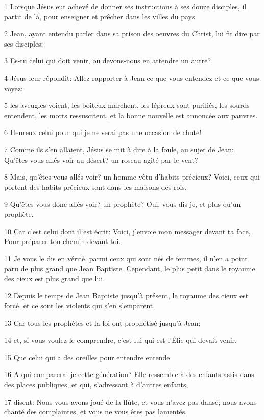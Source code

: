 \par 1 Lorsque Jésus eut achevé de donner ses instructions à ses douze disciples, il partit de là, pour enseigner et prêcher dans les villes du pays.
\par 2 Jean, ayant entendu parler dans sa prison des oeuvres du Christ, lui fit dire par ses disciples:
\par 3 Es-tu celui qui doit venir, ou devons-nous en attendre un autre?
\par 4 Jésus leur répondit: Allez rapporter à Jean ce que vous entendez et ce que vous voyez:
\par 5 les aveugles voient, les boiteux marchent, les lépreux sont purifiés, les sourds entendent, les morts ressuscitent, et la bonne nouvelle est annoncée aux pauvres.
\par 6 Heureux celui pour qui je ne serai pas une occasion de chute!
\par 7 Comme ils s'en allaient, Jésus se mit à dire à la foule, au sujet de Jean: Qu'êtes-vous allés voir au désert? un roseau agité par le vent?
\par 8 Mais, qu'êtes-vous allés voir? un homme vêtu d'habits précieux? Voici, ceux qui portent des habits précieux sont dans les maisons des rois.
\par 9 Qu'êtes-vous donc allés voir? un prophète? Oui, vous dis-je, et plus qu'un prophète.
\par 10 Car c'est celui dont il est écrit: Voici, j'envoie mon messager devant ta face, Pour préparer ton chemin devant toi.
\par 11 Je vous le dis en vérité, parmi ceux qui sont nés de femmes, il n'en a point paru de plus grand que Jean Baptiste. Cependant, le plus petit dans le royaume des cieux est plus grand que lui.
\par 12 Depuis le temps de Jean Baptiste jusqu'à présent, le royaume des cieux est forcé, et ce sont les violents qui s'en s'emparent.
\par 13 Car tous les prophètes et la loi ont prophétisé jusqu'à Jean;
\par 14 et, si vous voulez le comprendre, c'est lui qui est l'Élie qui devait venir.
\par 15 Que celui qui a des oreilles pour entendre entende.
\par 16 A qui comparerai-je cette génération? Elle ressemble à des enfants assis dans des places publiques, et qui, s'adressant à d'autres enfants,
\par 17 disent: Nous vous avons joué de la flûte, et vous n'avez pas dansé; nous avons chanté des complaintes, et vous ne vous êtes pas lamentés.
